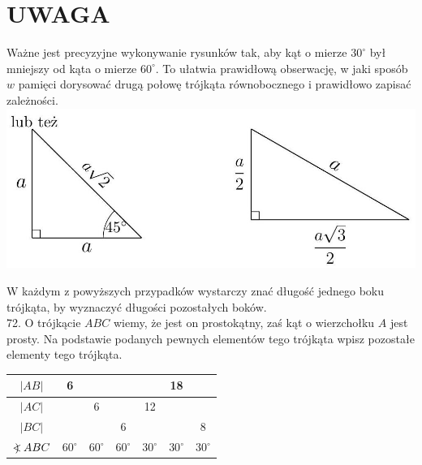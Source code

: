 \documentclass[10pt]{article}
\newcommand\Varangle{\mathop{{<\!\!\!\!\!\text{\small)}}\:}\nolimits}
\begin{document}
\section*{UWAGA}
Ważne jest precyzyjne wykonywanie rysunków tak, aby kąt o mierze \(30^{\circ}\) był mniejszy od kąta o mierze \(60^{\circ}\). To ułatwia prawidłową obserwację, w jaki sposób \(w\) pamięci dorysować drugą połowę trójkąta równobocznego i prawidłowo zapisać zależności.\\
\includegraphics[max width=\textwidth, center]{2024_11_21_71f62bd117d375398909g-134}

W każdym z powyższych przypadków wystarczy znać długość jednego boku trójkąta, by wyznaczyć długości pozostałych boków.\\
72. O trójkącie \(A B C\) wiemy, że jest on prostokątny, zaś kąt o wierzchołku \(A\) jest prosty. Na podstawie podanych pewnych elementów tego trójkąta wpisz pozostałe elementy tego trójkąta.

\begin{center}
\begin{tabular}{|c|c|c|c|c|c|c|}
\hline
\(|A B|\) & 6 &  &  &  & 18 &  \\
\hline
\(|A C|\) &  & 6 &  & 12 &  &  \\
\hline
\(|B C|\) &  &  & 6 &  &  & 8 \\
\hline
\(\Varangle A B C\) & \(60^{\circ}\) & \(60^{\circ}\) & \(60^{\circ}\) & \(30^{\circ}\) & \(30^{\circ}\) & \(30^{\circ}\) \\
\hline
\end{tabular}
\end{center}
\end{document}
